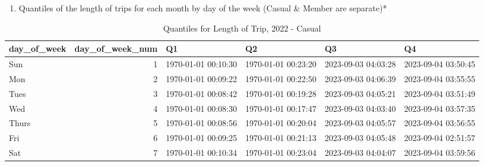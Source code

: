 \documentclass[
]{article}
\providecommand{\tightlist}{%
  \setlength{\itemsep}{0pt}\setlength{\parskip}{0pt}}
\begin{document}
\begin{enumerate}
\def\labelenumi{\arabic{enumi}.}
\setcounter{enumi}{1}
\tightlist
\item
  Quantiles of the length of trips for each month by day of the week
  (Casual \& Member are separate)*
\end{enumerate}

\begin{table}

\caption{\label{tab:Example Quantiles 2022 - Casual}Quantiles for Length of Trip, 2022 - Casual}
\centering
\begin{tabular}[t]{l|r|l|l|l|l}
\hline
day\_of\_week & day\_of\_week\_num & Q1 & Q2 & Q3 & Q4\\
\hline
Sun & 1 & 1970-01-01 00:10:30 & 1970-01-01 00:23:20 & 2023-09-03 04:03:28 & 2023-09-04 03:50:45\\
\hline
Mon & 2 & 1970-01-01 00:09:22 & 1970-01-01 00:22:50 & 2023-09-03 04:06:39 & 2023-09-04 03:55:55\\
\hline
Tues & 3 & 1970-01-01 00:08:42 & 1970-01-01 00:19:28 & 2023-09-03 04:05:21 & 2023-09-04 03:51:49\\
\hline
Wed & 4 & 1970-01-01 00:08:30 & 1970-01-01 00:17:47 & 2023-09-03 04:03:40 & 2023-09-04 03:57:35\\
\hline
Thurs & 5 & 1970-01-01 00:08:56 & 1970-01-01 00:20:04 & 2023-09-03 04:05:57 & 2023-09-04 03:56:55\\
\hline
Fri & 6 & 1970-01-01 00:09:25 & 1970-01-01 00:21:13 & 2023-09-03 04:05:48 & 2023-09-04 02:51:57\\
\hline
Sat & 7 & 1970-01-01 00:10:34 & 1970-01-01 00:23:04 & 2023-09-03 04:04:07 & 2023-09-04 03:59:56\\
\hline
\end{tabular}
\end{table}
\end{document}
